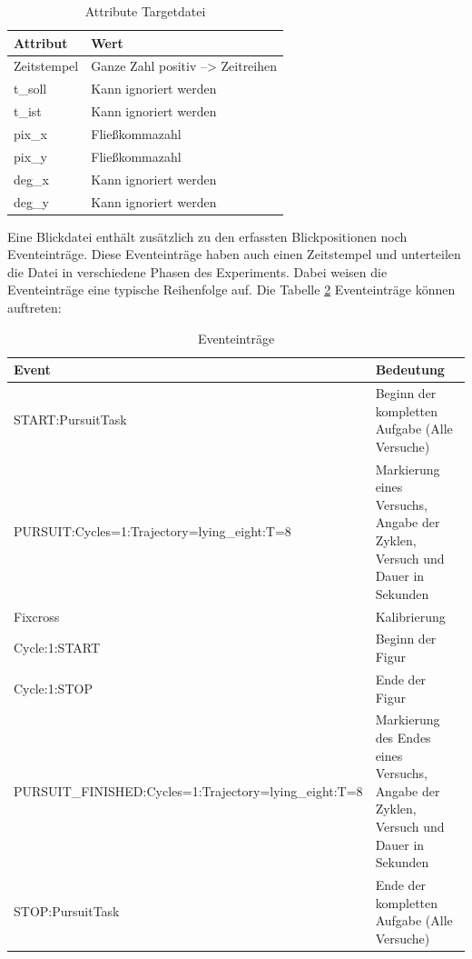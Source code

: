 \begin{table}[H]
	\caption{\label{tab:AttrTargetdatei}Attribute Targetdatei}
	
	
	\noindent \centering{}
	\bgroup
	\def\arraystretch{2}  %
	\begin{tabular}{|l|l|}
		\hline 
		\textbf{Attribut} & \textbf{Wert}\\
		\hline \hline
		Zeitstempel & Ganze Zahl positiv --> Zeitreihen\\
		\hline
		t\_soll & Kann ignoriert werden \\
		\hline
		t\_ist & Kann ignoriert werden \\
		\hline
		pix\_x & Flie\ss{}kommazahl \\
		\hline
		pix\_y & Flie\ss{}kommazahl \\
		\hline
		deg\_x & Kann ignoriert werden \\
		\hline
		deg\_y & Kann ignoriert werden \\
		\hline
	\end{tabular}
	\egroup
\end{table}

Eine Blickdatei enth\"alt zus\"atzlich zu den erfassten Blickpositionen noch Eventeintr\"age. Diese Eventeintr\"age haben auch einen Zeitstempel und unterteilen die Datei in verschiedene Phasen des Experiments. Dabei weisen die Eventeintr\"age eine typische Reihenfolge auf.
Die Tabelle \ref{tab:Events} Eventeintr\"age k\"onnen auftreten:

\begin{table}[H]
	\caption{\label{tab:Events}Eventeintr\"age}
	
	
	\noindent \centering{}
	\bgroup
	\def\arraystretch{2}  %
	\begin{tabular}{|p{7.5cm}|p{7.5cm}|}
		\hline 
		\textbf{Event} & \textbf{Bedeutung}\\
		\hline \hline
		START:PursuitTask & Beginn der kompletten Aufgabe (Alle Versuche)\\
		\hline
		PURSUIT:Cycles=1:Trajectory=lying\_eight:\newline T=8 & Markierung eines Versuchs,\newline
		Angabe der Zyklen, \newline
		Versuch und Dauer in Sekunden \\
		\hline
		Fixcross & Kalibrierung \\
		\hline
		Cycle:1:START & Beginn der Figur \\
		\hline
		Cycle:1:STOP & Ende der Figur \\
		\hline
		PURSUIT\_FINISHED:Cycles=1:Trajectory\newline=lying\_eight:T=8 & Markierung des Endes eines Versuchs, \newline
		Angabe der Zyklen, \newline Versuch und Dauer in Sekunden \\
		\hline
		STOP:PursuitTask & Ende der kompletten Aufgabe (Alle Versuche) \\
		\hline
	\end{tabular}
	\egroup
\end{table}

